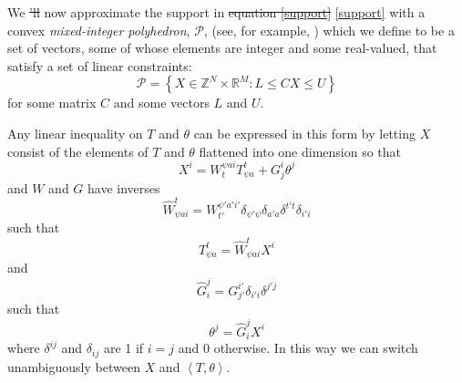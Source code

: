 \documentclass{article}
\providecommand{\DIFaddtex}[1]{{\protect\color{blue}\uwave{#1}}} %
\providecommand{\DIFdeltex}[1]{{\protect\color{red}\sout{#1}}}                      %
\providecommand{\DIFaddbegin}{} %
\providecommand{\DIFaddend}{} %
\providecommand{\DIFdelbegin}{} %
\providecommand{\DIFdelend}{} %
\providecommand{\DIFadd}[1]{\texorpdfstring{\DIFaddtex{#1}}{#1}} %
\providecommand{\DIFdel}[1]{\texorpdfstring{\DIFdeltex{#1}}{}} %
\newcommand{\DIFscaledelfig}{0.5}
\newlength{\DIFdelgraphicswidth} %
\newlength{\DIFdelgraphicsheight} %
\newcommand{\DIFaddincludegraphics}[2][]{{\color{blue}\fbox{\DIFOincludegraphics[#1]{#2}}}} %
\newcommand{\DIFdelincludegraphics}[2][]{%
\sbox{\DIFdelgraphicsbox}{\DIFOincludegraphics[#1]{#2}}%
\settoboxwidth{\DIFdelgraphicswidth}{\DIFdelgraphicsbox} %
\settoboxtotalheight{\DIFdelgraphicsheight}{\DIFdelgraphicsbox} %
\scalebox{\DIFscaledelfig}{%
\parbox[b]{\DIFdelgraphicswidth}{\usebox{\DIFdelgraphicsbox}\\[-\baselineskip] \rule{\DIFdelgraphicswidth}{0em}}\llap{\resizebox{\DIFdelgraphicswidth}{\DIFdelgraphicsheight}{%
\setlength{\unitlength}{\DIFdelgraphicswidth}%
\begin{picture}(1,1)%
\thicklines\linethickness{2pt} %
{\color[rgb]{1,0,0}\put(0,0){\framebox(1,1){}}}%
{\color[rgb]{1,0,0}\put(0,0){\line( 1,1){1}}}%
{\color[rgb]{1,0,0}\put(0,1){\line(1,-1){1}}}%
\end{picture}%
}\hspace*{3pt}}} %
} %
\DeclareRobustCommand{\DIFaddbegin}{\DIFOaddbegin \let\includegraphics\DIFaddincludegraphics} %
\DeclareRobustCommand{\DIFaddend}{\DIFOaddend \let\includegraphics\DIFOincludegraphics} %
\DeclareRobustCommand{\DIFdelbegin}{\DIFOdelbegin \let\includegraphics\DIFdelincludegraphics} %
\DeclareRobustCommand{\DIFdelend}{\DIFOaddend \let\includegraphics\DIFOincludegraphics} %
\begin{document}
We \DIFdelbegin \DIFdel{'ll }\DIFdelend \DIFaddbegin \DIFadd{will }\DIFaddend now approximate the support in \DIFdelbegin \DIFdel{equation \ref{support} }\DIFdelend \DIFaddbegin \eqref{support} \DIFaddend with a convex \textit{mixed-integer polyhedron}, $\mathcal{P}$, (see, for example, \citet{conforti2010polyhedral}) which we define to be a set of vectors, some of whose elements are integer and some real-valued, that satisfy a set of linear constraints:
\[
\mathcal{P} = \left\{ X\in\mathbb{Z}^N \times \mathbb{R}^M : L \le  CX \le U \right\}
\]
for some matrix $C$ and some vectors $L$ and $U$.

Any linear inequality on $T$ and $\theta$ can be expressed in this form by letting $X$ consist of the elements of $T$ and $\theta$ flattened into one dimension so that
\[
X^i = W^{\psi a i}_{t}T^t_{\psi a} + G^i_j\theta^j
\]
and $W$ and $G$ have inverses
\[
\hat{W}^t_{\psi a i} = W^{\psi' a' i'}_{t'}\delta_{\psi'\psi}\delta_{a'a}\delta^{t't}\delta_{i'i}
\]
such that
\[
T^t_{\psi a} = \hat{W}^{t}_{\psi a i}X^i
\]
and
\[
\hat{G}^j_i = G^{i'}_{j'}\delta_{i'i}\delta^{j'j}
\]
such that
\[
\theta^j = \hat{G}^{j}_{i} X^i
\]
where $\delta^{ij}$ and $\delta_{ij}$ are 1 if $i=j$ and 0 otherwise. In this way we can switch unambiguously between $X$ and $\left<T,\theta\right>$.
\end{document}
